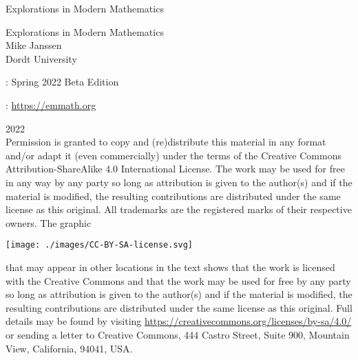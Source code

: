 \documentclass[oneside,10pt,]{book}
\newcommand{\titlepagefont}{\relax}
\numberwithin{equation}{section}
\begin{document}
\frontmatter
\thispagestyle{empty}
{\titlepagefont\centering
\vspace*{0.28\textheight}
{\Huge Explorations in Modern Mathematics}\\}
\clearpage
\thispagestyle{empty}
{\titlepagefont\centering
\vspace*{0.14\textheight}
{\Huge Explorations in Modern Mathematics}\\[3\baselineskip]
{\Large Mike Janssen}\\[0.5\baselineskip]
{\Large Dordt University}\\}
\clearpage
\thispagestyle{empty}
\hypertarget{g:colophon:idm3404625000}{}
: Spring 2022 Beta Edition\par\medskip
{}: \href{https:\slash{}\slash{}emmath.org}{https:\slash{}\slash{}emmath.org}\par\medskip
\noindent\textcopyright{}2022\textendash{}\quad{}\\[0.5\baselineskip]
Permission is granted to copy and (re)distribute this material in any format and\slash{}or adapt it (even commercially) under the terms of the Creative Commons Attribution-ShareAlike 4.0 International License.  The work may be used for free in any way by any party so long as attribution is given to the author(s) and if the material is modified, the resulting contributions are distributed under the same license as this original.  All trademarks\texttrademark{} are the registered\textregistered{} marks of their respective owners. The graphic \begin{sidebyside}{1}{0.375}{0.375}{0}%
\begin{sbspanel}{0.25}%
\texttt{[image: ./images/CC-BY-SA-license.svg]}
\end{sbspanel}%
\end{sidebyside}%
 that may appear in other locations in the text shows that the work is licensed with the Creative Commons and that the work may be used for free by any party so long as attribution is given to the author(s) and if the material is modified, the resulting contributions are distributed under the same license as this original. Full details may be found by visiting \href{https://creativecommons.org/licenses/by-sa/4.0/}{https:\slash{}\slash{}creativecommons.org\slash{}licenses\slash{}by-sa\slash{}4.0\slash{}}  or sending a letter to Creative Commons, 444 Castro Street, Suite 900, Mountain View, California, 94041, USA.\par\medskip
\end{document}
